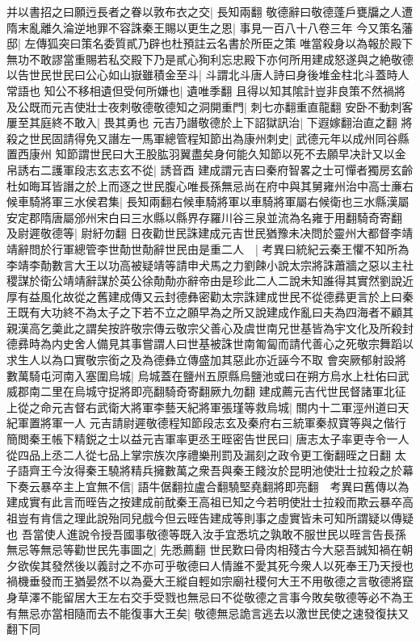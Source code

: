 并以書招之曰願迃長者之眷以敦布衣之交|{
	長知兩翻}
敬德辭曰敬德蓬戶甕牖之人遭隋末亂離久淪逆地罪不容誅秦王賜以更生之恩|{
	事見一百八十八卷三年}
今又策名藩邸|{
	左傳狐突曰策名委質貳乃辟也杜預註云名書於所臣之策}
唯當殺身以為報於殿下無功不敢謬當重賜若私交殿下乃是貳心狥利忘忠殿下亦何所用建成怒遂與之絶敬德以告世民世民曰公心如山嶽雖積金至斗|{
	斗謂北斗唐人詩曰身後堆金柱北斗蓋時人常語也}
知公不移相遺但受何所嫌也|{
	遺唯季翻}
且得以知其隂計豈非良策不然禍將及公既而元吉使壯士夜刺敬德敬德知之洞開重門|{
	刺七亦翻重直龍翻}
安卧不動刺客屢至其庭終不敢入|{
	畏其勇也}
元吉乃譖敬德於上下詔獄訊治|{
	下遐嫁翻治直之翻}
將殺之世民固請得免又譖左一馬軍總管程知節出為康州刺史|{
	武德元年以成州同谷縣置西康州}
知節謂世民曰大王股肱羽翼盡矣身何能久知節以死不去願早决計又以金帛誘右二護軍段志玄志玄不從|{
	誘音酉}
建成謂元吉曰秦府智畧之士可憚者獨房玄齡杜如晦耳皆譖之於上而逐之世民腹心唯長孫無忌尚在府中與其舅雍州治中高士亷右候車騎將軍三水侯君集|{
	長知兩翻右候車騎將軍以車騎將軍屬右候衛也三水縣漢屬安定郡隋唐屬邠州宋白曰三水縣以縣界存羅川谷三泉並流為名雍于用翻騎奇寄翻}
及尉遲敬德等|{
	尉紆勿翻}
日夜勸世民誅建成元吉世民猶豫未决問於靈州大都督李靖靖辭問於行軍總管李世勣世勣辭世民由是重二人　|{
	考異曰統紀云秦王懼不知所為李靖李勣數言大王以功高被疑靖等請申犬馬之力劉餗小說太宗將誅蕭牆之惡以主社稷謀於衛公靖靖辭謀於英公徐勣勣亦辭帝由是珍此二人二說未知誰得其實然劉說近厚有益風化故從之舊建成傳又云封德彝密勸太宗誅建成世民不從德彞更言於上曰秦王既有大功終不為太子之下若不立之願早為之所又說建成作亂曰夫為四海者不顧其親漢高乞羮此之謂矣按許敬宗傳云敬宗父善心及虞世南兄世基皆為宇文化及所殺封德彞時為内史舍人備見其事嘗謂人曰世基被誅世南匍匐而請代善心之死敬宗舞蹈以求生人以為口實敬宗銜之及為德彝立傳盛加其惡此亦近誣今不取}
會突厥郁射設將數萬騎屯河南入塞圍烏城|{
	烏城蓋在鹽州五原縣烏鹽池或曰在朔方烏水上杜佑曰武威郡南二里在烏城守捉將即亮翻騎奇寄翻厥九勿翻}
建成薦元吉代世民督諸軍北征上從之命元吉督右武衛大將軍李藝天紀將軍張瑾等救烏城|{
	關内十二軍涇州道曰天紀軍置將軍一人}
元吉請尉遲敬德程知節段志玄及秦府右三統軍秦叔寶等與之偕行簡閲秦王帳下精鋭之士以益元吉軍率更丞王晊密告世民曰|{
	唐志太子率更寺令一人從四品上丞二人從七品上掌宗族次序禮樂刑罰及漏刻之政令更工衡翻晊之日翻}
太子語齊王今汝得秦王驍將精兵擁數萬之衆吾與秦王餞汝於昆明池使壯士拉殺之於幕下奏云暴卒主上宜無不信|{
	語牛倨翻拉盧合翻驍堅堯翻將即亮翻　考異曰舊傳以為建成實有此言而晊告之按建成前酖秦王高祖已知之今若明使壯士拉殺而欺云暴卒高祖豈有肯信之理此說殆同兒戲今但云晊告建成等則事之虛實皆未可知所謂疑以傳疑也}
吾當使人進說令授吾國事敬德等既入汝手宜悉坑之孰敢不服世民以晊言告長孫無忌等無忌等勸世民先事圖之|{
	先悉薦翻}
世民歎曰骨肉相殘古今大惡吾誠知禍在朝夕欲俟其發然後以義討之不亦可乎敬德曰人情誰不愛其死今衆人以死奉王乃天授也禍機垂發而王猶晏然不以為憂大王縱自輕如宗廟社稷何大王不用敬德之言敬德將竄身草澤不能留居大王左右交手受戮也無忌曰不從敬德之言事今敗矣敬德等必不為王有無忌亦當相隨而去不能復事大王矣|{
	敬德無忌詭言逃去以激世民使之速發復扶又翻下同}
